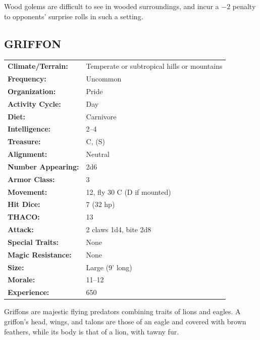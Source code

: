 \begin{multicols}{2}
Wood golems are difficult to see in wooded surroundings, and incur a $-2$ penalty to opponents' surprise rolls in such a setting.

\noindent \begin{minipage}{\columnwidth}

\vspace{1em}

\subsection{GRIFFON}

\noindent \begin{tabular}{p{}p{}}
\textbf{Climate/Terrain:}	& Temperate or subtropical hills or mountains \\
\textbf{Frequency:} 		& Uncommon \\
\textbf{Organization:} 		& Pride \\
\textbf{Activity Cycle:} 	& Day	\\
\textbf{Diet:} 				& Carnivore \\
\textbf{Intelligence:} 		& 2--4 \\
\textbf{Treasure:} 			& C, (S) \\
\textbf{Alignment:} 		& Neutral \\
\hline
\textbf{Number Appearing:} 	& 2d6 \\
\textbf{Armor Class:} 		& 3 \\
\textbf{Movement:} 			& 12, fly 30 C (D if mounted) \\
\textbf{Hit Dice:} 			& 7 (32 hp) \\
\textbf{THACO:} 			& 13 \\
\textbf{Attack:} 			& 2 claws 1d4, bite 2d8 \\
\textbf{Special Traits:} & None \\
\textbf{Magic Resistance:} 	& None \\
\textbf{Size:} 				& Large (9' long) \\
\textbf{Morale:} 			& 11--12 \\
\textbf{Experience:} 		& 650 \\
\end{tabular}

\end{minipage}

Griffons are majestic flying predators combining traits of lions and eagles. A griffon's head, wings, and talons are those of an eagle and covered with brown feathers, while its body is that of a lion, with tawny fur. 


\end{multicols}

